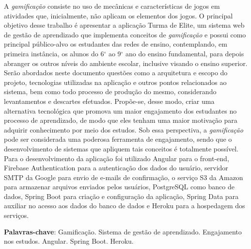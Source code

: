 \setlength{\absparsep}{18pt} %
\begin{resumo}

 \vspace{\onelineskip}

 A \textit{gamificação} consiste no uso de mecânicas e características de jogos em atividades que, inicialmente, não aplicam os elementos dos jogos. O principal objetivo desse trabalho é apresentar a aplicação Turma de Elite, um sistema web de gestão de aprendizado que implementa conceitos de \textit{gamificação} e possui como principal público-alvo os estudantes das redes de ensino, contemplando, em primeira instância, os alunos do 6$^\circ$ ao 9$^\circ$ ano do ensino fundamental, para depois abranger os outros níveis do ambiente escolar, inclusive visando o ensino superior. Serão abordados neste documento questões como a arquitetura e escopo do projeto, tecnologias utilizadas na aplicação e outros pontos relacionados ao sistema, bem como todo processo de produção do mesmo, considerando levantamentos e descartes efetuados. 
 Propõe-se, desse modo, criar uma alternativa tecnológica que promova um maior engajamento dos estudantes no processo de aprendizado, de modo que eles tenham uma maior motivação para adquirir conhecimento por meio dos estudos. Sob essa perspectiva, a \textit{gamificação} pode ser considerada uma poderosa ferramenta de engajamento, sendo que o desenvolvimento de sistemas que apliquem tais conceitos é totalmente possível. Para o desenvolvimento da aplicação foi utilizado Angular para o front-end, Firebase Authentication para a autenticação dos dados do usuário, servidor SMTP da Google para envio de e-mails de confirmação, o serviço S3 da Amazon para armazenar arquivos enviados pelos usuários, PostgreSQL como banco de dados, Spring Boot para criação e configuração da aplicação, Spring Data para auxiliar no acesso aos dados do banco de dados e Heroku para a hospedagem dos serviços.
 
 \vspace{\onelineskip}
 
 \textbf{Palavras-chave}: Gamificação. Sistema de gestão de aprendizado. Engajamento nos estudos. Angular. Spring Boot. Heroku.
 
\end{resumo}

